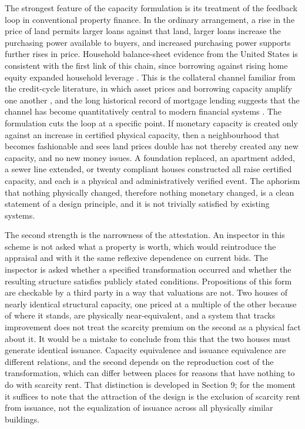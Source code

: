 \documentclass[11pt]{article}
\theoremstyle{definition}
\begin{document}
The strongest feature of the capacity formulation is its treatment of the feedback loop in conventional property finance. In the ordinary arrangement, a rise in the price of land permits larger loans against that land, larger loans increase the purchasing power available to buyers, and increased purchasing power supports further rises in price. Household balance-sheet evidence from the United States is consistent with the first link of this chain, since borrowing against rising home equity expanded household leverage \cite{mian2011}. This is the collateral channel familiar from the credit-cycle literature, in which asset prices and borrowing capacity amplify one another \cite{kiyotaki1997, bernanke1989}, and the long historical record of mortgage lending suggests that the channel has become quantitatively central to modern financial systems \cite{jorda2016, knoll2017, schularick2012}. The formulation cuts the loop at a specific point. If monetary capacity is created only against an increase in certified physical capacity, then a neighbourhood that becomes fashionable and sees land prices double has not thereby created any new capacity, and no new money issues. A foundation replaced, an apartment added, a sewer line extended, or twenty compliant houses constructed all raise certified capacity, and each is a physical and administratively verified event. The aphorism that nothing physically changed, therefore nothing monetary changed, is a clean statement of a design principle, and it is not trivially satisfied by existing systems.

The second strength is the narrowness of the attestation. An inspector in this scheme is not asked what a property is worth, which would reintroduce the appraisal and with it the same reflexive dependence on current bids. The inspector is asked whether a specified transformation occurred and whether the resulting structure satisfies publicly stated conditions. Propositions of this form are checkable by a third party in a way that valuations are not. Two houses of nearly identical structural capacity, one priced at a multiple of the other because of where it stands, are physically near-equivalent, and a system that tracks improvement does not treat the scarcity premium on the second as a physical fact about it. It would be a mistake to conclude from this that the two houses must generate identical issuance. Capacity equivalence and issuance equivalence are different relations, and the second depends on the reproduction cost of the transformation, which can differ between places for reasons that have nothing to do with scarcity rent. That distinction is developed in Section 9; for the moment it suffices to note that the attraction of the design is the exclusion of scarcity rent from issuance, not the equalization of issuance across all physically similar buildings.
\end{document}
